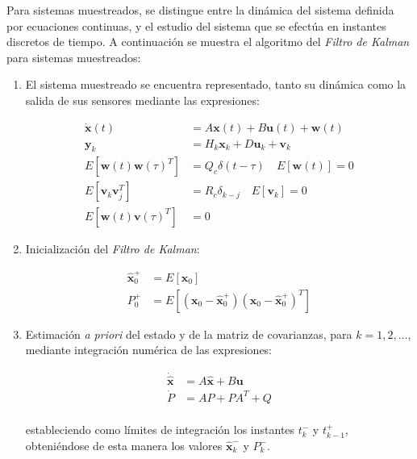 Para sistemas muestreados, se distingue entre la dinámica del sistema definida por ecuaciones continuas, y el estudio del sistema que se efectúa en instantes discretos de tiempo. A continuación se muestra el algoritmo del \emph{Filtro de Kalman} para sistemas muestreados:

\begin{enumerate}

\item El sistema muestreado se encuentra representado, tanto su dinámica como la salida de sus sensores mediante las expresiones:

\begin{equation}
\begin{split}
	\boldsymbol{\dot{x}}(t) &= A\boldsymbol{x}(t) + B\boldsymbol{u}(t) + \boldsymbol{w}(t) \\
	\boldsymbol{y}_k &= H_k\boldsymbol{x}_k + D\boldsymbol{u}_k + \boldsymbol{v}_k \\
	E[\boldsymbol{w}(t)\boldsymbol{w}(\tau)^T] &= Q_c \delta(t-\tau) \quad E[\boldsymbol{w}(t)] = 0 \\
	E[\boldsymbol{v}_k\boldsymbol{v}_j^T] &= R_c \delta_{k-j} \quad E[\boldsymbol{v}_k] = 0 \\
	E[\boldsymbol{w}(t)\boldsymbol{v}(\tau)^T] &= 0
\end{split}
\end{equation}

\item Inicialización del \emph{Filtro de Kalman}:

\begin{equation}
\begin{split}
	\boldsymbol{\hat{x}}_0^{+} &= E[\boldsymbol{x}_0] \\
	P_0^{+}  &= E[(\boldsymbol{x}_0 - \boldsymbol{\hat{x}}_0^{+}) (\boldsymbol{x}_0 - \boldsymbol{\hat{x}}_0^{+})^T]
\end{split}
\end{equation}

\item Estimación \emph{a priori} del estado y de la matriz de covarianzas, para $k = 1,2, \ldots$, mediante integración numérica de las expresiones: 

\begin{equation}
\begin{split}
	\boldsymbol{\dot{\hat{x}}} &= A\boldsymbol{\hat{x}} + B\boldsymbol{u} \\
	\dot{P} &= AP + PA^T + Q
\end{split}
\end{equation} \\
\noindent
estableciendo como límites de integración los instantes $t_k^{-}$ y $t_{k-1}^{+}$, obteniéndose de esta manera los valores $\boldsymbol{\hat{x}}_k^{-}$ y $P_k^{-}$. \par 


\end{enumerate}
